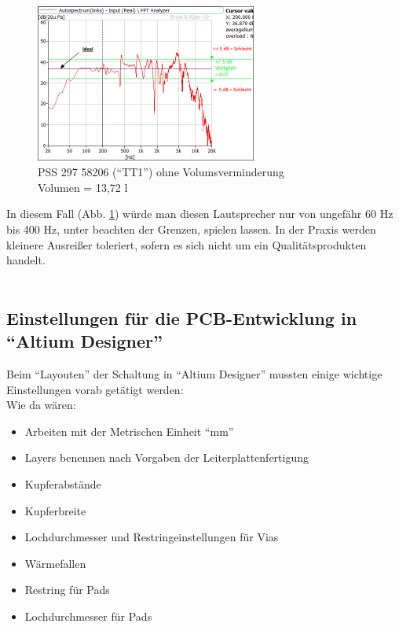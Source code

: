 \newpage
\begin{figure} [H]
	\centering
	\includegraphics[width=0.65\textwidth]{img/Optimierung/TT/TT1_ohneAllem_welligkeit.png}
	\caption{PSS 297 58206 (\enquote{TT1}) ohne Volumsverminderung \\Volumen = 13,72 l}
	\label{fig:8.6.1}
\end{figure}

In diesem Fall (Abb. \ref{fig:8.6.1}) würde man diesen Lautsprecher nur von ungefähr 60 Hz bis 400 Hz, unter beachten der Grenzen, spielen lassen.
In der Praxis werden kleinere Ausreißer toleriert, sofern es sich nicht um ein Qualitätsprodukten handelt.\\ \\


\subsection{Einstellungen für die PCB-Entwicklung in \enquote{Altium Designer}}\label{subsec:8.1}
Beim \enquote{Layouten} der Schaltung in \enquote{Altium Designer} mussten einige wichtige Einstellungen vorab getätigt werden:\\
Wie da wären:
\begin{itemize}
	\item Arbeiten mit der Metrischen Einheit \enquote{mm}
	\item Layers benennen nach Vorgaben der Leiterplattenfertigung
	\item Kupferabstände
	\item Kupferbreite
	\item Lochdurchmesser und Restringeinstellungen für Vias
	\item Wärmefallen
	\item Restring für Pads
	\item Lochdurchmesser für Pads
\end{itemize}

